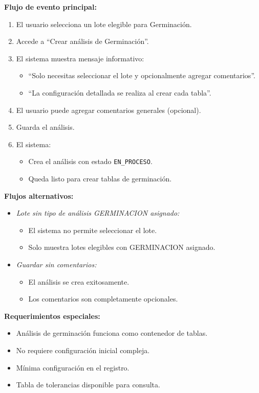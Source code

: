 \vspace{0.5em}
\noindent\textbf{Flujo de evento principal:}
\begin{enumerate}[nosep]
    \item El usuario selecciona un lote elegible para Germinación.
    \item Accede a ``Crear análisis de Germinación''.
    \item El sistema muestra mensaje informativo:
    \begin{itemize}[nosep]
        \item ``Solo necesitas seleccionar el lote y opcionalmente agregar comentarios''.
        \item ``La configuración detallada se realiza al crear cada tabla''.
    \end{itemize}
    \item El usuario puede agregar comentarios generales (opcional).
    \item Guarda el análisis.
    \item El sistema:
    \begin{itemize}[nosep]
        \item Crea el análisis con estado \texttt{EN\_PROCESO}.
        \item Queda listo para crear tablas de germinación.
    \end{itemize}
\end{enumerate}

\vspace{0.5em}
\noindent\textbf{Flujos alternativos:}
\begin{itemize}[nosep]
    \item \textit{Lote sin tipo de análisis GERMINACION asignado:}
    \begin{itemize}[nosep]
        \item El sistema no permite seleccionar el lote.
        \item Solo muestra lotes elegibles con GERMINACION asignado.
    \end{itemize}
    \item \textit{Guardar sin comentarios:}
    \begin{itemize}[nosep]
        \item El análisis se crea exitosamente.
        \item Los comentarios son completamente opcionales.
    \end{itemize}
\end{itemize}

\vspace{0.5em}
\noindent\textbf{Requerimientos especiales:}
\begin{itemize}[nosep]
    \item Análisis de germinación funciona como contenedor de tablas.
    \item No requiere configuración inicial compleja.
    \item Mínima configuración en el registro.
    \item Tabla de tolerancias disponible para consulta.
\end{itemize}

